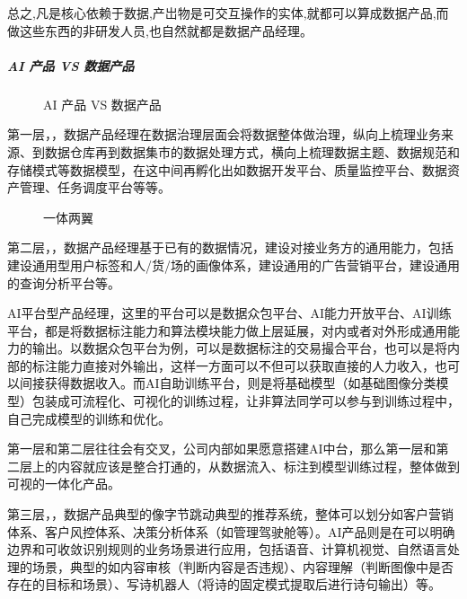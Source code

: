 \documentclass[letterpaper,10pt,english]{sphinxmanual}
\begin{document}
总之,凡是核心依赖于数据,产岀物是可交互操作的实体,就都可以算成数据产品,而做这些东西的非研发人员,也自然就都是数据产品经理。


\subparagraph{AI 产品 VS 数据产品}
\label{\detokenize{chapter_introduction/AI_PM:ai-vs}}
\begin{figure}[H]
\centering
\capstart

\noindent{}
\caption{AI 产品 VS
数据产品\sphinxfootnotemark[292]}\label{\detokenize{chapter_introduction/AI_PM:id59}}\end{figure}
%
\begin{footnotetext}[292]\sphinxAtStartFootnote
{}
%
\end{footnotetext}\ignorespaces 
第一层，，数据产品经理在数据治理层面会将数据整体做治理，纵向上梳理业务来源、到数据仓库再到数据集市的数据处理方式，横向上梳理数据主题、数据规范和存储模式等数据模型，在这中间再孵化出如数据开发平台、质量监控平台、数据资产管理、任务调度平台等等。

\begin{figure}[H]
\centering
\capstart

\noindent{}
\caption{一体两翼}\label{\detokenize{chapter_introduction/AI_PM:id60}}\end{figure}

第二层，，数据产品经理基于已有的数据情况，建设对接业务方的通用能力，包括建设通用型用户标签和人/货/场的画像体系，建设通用的广告营销平台，建设通用的查询分析平台等。

AI平台型产品经理，这里的平台可以是数据众包平台、AI能力开放平台、AI训练平台，都是将数据标注能力和算法模块能力做上层延展，对内或者对外形成通用能力的输出。以数据众包平台为例，可以是数据标注的交易撮合平台，也可以是将内部的标注能力直接对外输出，这样一方面可以不但可以获取直接的人力收入，也可以间接获得数据收入。而AI自助训练平台，则是将基础模型（如基础图像分类模型）包装成可流程化、可视化的训练过程，让非算法同学可以参与到训练过程中，自己完成模型的训练和优化。

第一层和第二层往往会有交叉，公司内部如果愿意搭建AI中台，那么第一层和第二层上的内容就应该是整合打通的，从数据流入、标注到模型训练过程，整体做到可视的一体化产品。

第三层，，数据产品典型的像字节跳动典型的推荐系统，整体可以划分如客户营销体系、客户风控体系、决策分析体系（如管理驾驶舱等）。AI产品则是在可以明确边界和可收敛识别规则的业务场景进行应用，包括语音、计算机视觉、自然语言处理的场景，典型的如内容审核（判断内容是否违规）、内容理解（判断图像中是否存在的目标和场景）、写诗机器人（将诗的固定模式提取后进行诗句输出）等。
\end{document}

